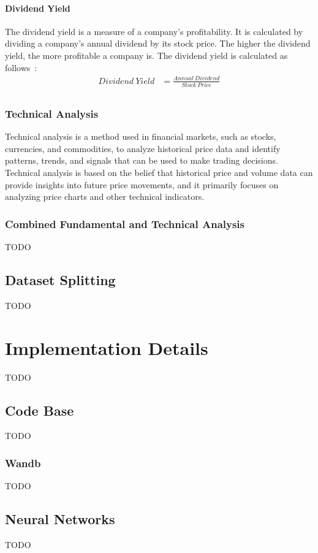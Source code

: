 \documentclass[../xlapes02]{subfiles}
\begin{document}
    \paragraph{Dividend Yield}\label{par:dividend-yield}
    The dividend yield is a measure of a company's profitability. It is calculated by dividing a company's annual dividend by its stock price. The higher the dividend yield, the more profitable a company is. The dividend yield is calculated as follows~\cite{investopedia-dividend-yield}:
    \begin{equation}
        \begin{split}
            Dividend\ Yield&=\frac{Annual\ Dividend}{Stock\ Price}\\
        \end{split}
    \end{equation}

    \subsubsection{Technical Analysis}\label{subsubsec:technical-analysis}
    Technical analysis is a method used in financial markets, such as stocks, currencies, and commodities, to analyze historical price data and identify patterns, trends, and signals that can be used to make trading decisions. Technical analysis is based on the belief that historical price and volume data can provide insights into future price movements, and it primarily focuses on analyzing price charts and other technical indicators.

    \subsubsection{Combined Fundamental and Technical Analysis}\label{subsubsec:combined-fundamental-and-technical-analysis}
    TODO

    \subsection{Dataset Splitting}\label{subsec:dataset-splitting}
    TODO


    \section{Implementation Details}\label{sec:implementation-details}
    TODO

    \subsection{Code Base}\label{subsec:code-base}
    TODO

    \subsubsection{Wandb}\label{subsubsec:wandb}
    TODO

    \subsection{Neural Networks}\label{subsec:neural-network}
    TODO

\end{document}
